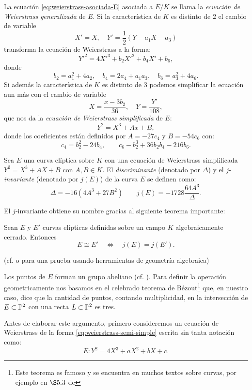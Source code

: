 \documentclass[../../tesis_maestria]{subfiles}
\begin{document}
La ecuación \ref{eq:weierstrass-asociada-E} asociada a $E/K$ se llama la \emph{ecuación de Weierstrass generalizada} de $E$. Si la característica de $K$ es distinto de 2 el cambio de variable
\[
	X'=X,\quad Y'=\frac{1}{2}(Y-a_1X-a_3)
\]
transforma la ecuación de Weierstrass a la forma:
\begin{equation}\label{eq:weierstrass-semi-simple}
  Y'^2=4X'^3+b_2X'^2+b_4X'+b_6,
\end{equation}
donde
\[
	b_2=a_1^2+4a_2,\quad b_4=2a_4+a_1a_3,\quad b_6=a_3^2+4a_6.
\]
Si además la característica de $K$ es distinto de 3 podemos simplificar la ecuación aun más con el cambio de variable
\[
	X=\frac{x-3b_2}{36},\quad Y=\frac{Y'}{108},
\]
que nos da la \emph{ecuación de Weierstrass simplificada} de $E$:
\[
	Y^2=X^3+Ax+B,
\]
donde los coeficientes están definidos por $A=-27c_4$ y $B=-54c_6$ con:
\[
	c_4=b_2^2-24b_4,\qquad c_6-b_2^3+36b_2b_4-216b_6.
\]
\begin{defin}
  Sea $E$ una curva el\'iptica sobre $K$ con una ecuación de Weierstrass simplificada $Y^2=X^3+AX+B$ con $A,B\in K$. El \emph{discriminante} (denotado por $\Delta$) y el $j$-\emph{invariante} (denotado por $j(E)$) de la curva $E$ se definen como:
  \[
    \Delta=-16(4A^3+27B^2) \qquad j(E)=-1728\frac{64 A^3}{\Delta}.
  \]
\end{defin}

El $j$-invariante obtiene su nombre gracias al siguiente teorema importante:

\begin{thm}\label{thm:clasificar-j-invariante}
  Sean $E$ y $E'$ curvas el\'ipticas definidas sobre un campo $K$ algebraicamente cerrado.
  Entonces
  \[
    E\cong E' \quad \iff \quad j(E)=j(E'). 
  \]  
\end{thm}
\noindent (cf. \cite[\S3.1, proposici\'on 1.4]{SilvermanTAOEC} o
\cite[cap\'itulo IV, teorema 4.1]{HartshorneAG} para una prueba usando herramientas de geometr\'ia
algebraica)

Los puntos de $E$ forman un grupo abeliano (cf. \cite[\S3.2]{SilvermanTAOEC}). Para definir la operación geometricamente nos basamos en el celebrado teorema de Bézout\footnote{Este teorema es famoso y se encuentra en muchos textos sobre curvas, por ejemplo en $\S 5.3$ de\cite{FultonAC}} que, en nuestro caso, dice que la cantidad de puntos, contando multiplicidad, en la intersección de $E\subset\mathbb{P}^2$ con una recta $L\subset\mathbb{P}^2$ es tres.

Antes de elaborar este argumento, primero consideremos un ecuación de Weierstrass de la forma \ref{eq:weierstrass-semi-simple} escrita sin tanta notación como:
\begin{equation}\label{eq:weierstrass-ss}
	E: Y^2=4X^3+aX^2+bX+c.
\end{equation}
	
\end{document}
